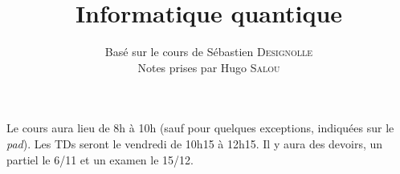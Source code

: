 \documentclass{../notes}
\title{Informatique quantique}
\author{Basé sur le cours de Sébastien \textsc{Designolle} \\ Notes prises par Hugo \textsc{Salou}}
\begin{document}
  \maketitle

  \dominitoc
  \tableofcontents

  \pagebreak

  Le cours aura lieu de 8h à 10h (sauf pour quelques exceptions, indiquées sur le \textit{pad}).
  Les TDs seront le vendredi de 10h15 à 12h15.
  Il y aura des devoirs, un partiel le 6/11 et un examen le 15/12.

  
  
\end{document}
